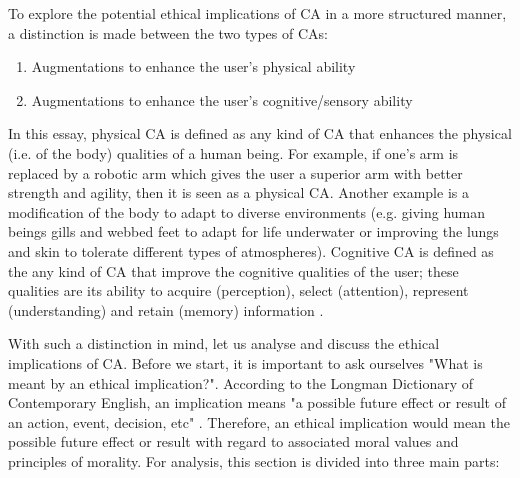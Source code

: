 To explore the potential ethical implications of CA in a more structured manner, a distinction is made between the two types of CAs: 
\begin{enumerate}
	\item Augmentations to enhance the user's physical ability
	\item Augmentations to enhance the user's cognitive/sensory ability
\end{enumerate}

In this essay, physical CA is defined as any kind of CA that enhances the physical (i.e. of the body) qualities of a human being. For example, if one's arm is replaced by a robotic arm which gives the user a superior arm with better strength and agility, then it is seen as a physical CA. Another example is a modification of the body to adapt to diverse environments (e.g. giving human beings gills and webbed feet to adapt for life underwater or improving the lungs and skin to tolerate different types of atmospheres). Cognitive CA is defined as the any kind of CA that improve the cognitive qualities of the user; these qualities are its ability to acquire (perception), select (attention), represent (understanding) and retain (memory) information \cite[pg. 312]{bostrom2009cognitive}.


With such a distinction in mind, let us analyse and discuss the ethical implications of CA. Before we start, it is important to ask ourselves "What is meant by an ethical implication?". According to the Longman Dictionary of Contemporary English, an implication means "a possible future effect or result of an action, event, decision, etc" \cite{Longman_dic}. Therefore, an ethical implication would mean the possible future effect or result with regard to associated moral values and principles of morality. For analysis, this section is divided into three main parts: 

